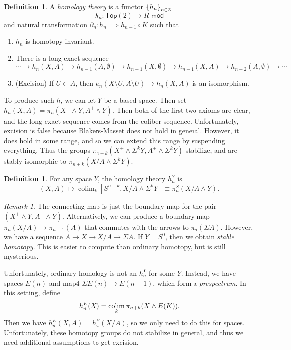\documentclass[leqno, openany]{memoir}
\theoremstyle{definition}
\newtheorem{defn}[thm]{Definition}
\theoremstyle{remark}
\newtheorem{rmk}[thm]{Remark}
\theoremstyle{plain}
\theoremstyle{definition}
\theoremstyle{remark}
\newcommand{\Z}{\mathbb{Z}}
\newcommand{\ms}[1]{\mathsf{#1}}
\newcommand{\ol}[1]{\overline{#1}}
\begin{document}
\begin{defn}
    A \textit{homology theory} is a functor $\qty{h_n}_{n \in \Z}$ 
    \[ h_n \colon \ms{Top}(2) \to R\text{-}\ms{mod} \]
    and natural transformation $\partial_n \colon h_n \implies h_{n-1} \circ K$ such that
    \begin{enumerate}
        \item $h_n$ is homotopy invariant.
        \item There is a long exact sequence
            \[ \cdots \to h_n(X, A) \to h_{n-1}(A, \emptyset) \to h_{n-1}(X, \emptyset) \to h_{n-1}(X,A) \to h_{n-2}(A, \emptyset) \to \cdots \]
        \item (Excision) If $\ol{U} \subset A$, then $h_n(X \setminus U, A \setminus U) \to h_n(X, A)$ is an isomorphism.
    \end{enumerate}
\end{defn}

To produce such $h$, we can let $Y$ be a based space. Then set $h_n(X, A) = \pi_n(X^+ \wedge Y, A^+ \wedge Y)$. Then both of the first two axioms are clear, and the long exact sequence comes from the cofiber sequence. Unfortunately, excision is false because Blakers-Masset does not hold in general. However, it does hold in some range, and so we can extend this range by suspending everything. Thus the groups $\pi_{n+k} (X^+ \wedge \Sigma^k Y, A^+ \wedge \Sigma^k Y)$ stabilize, and are stably isomorphic to $\pi_{n+k}(X/A \wedge \Sigma^k Y)$.

\begin{defn}
    For any space $Y$, the homology theory $h_n^Y$ is 
    \[ (X,A) \mapsto \operatorname{colim}_k [S^{n+k}, X/A \wedge \Sigma^k Y] \equiv \pi_n^S(X/A \wedge Y). \]
\end{defn}


\begin{rmk}
    The connecting map is just the boundary map for the pair $(X^+ \wedge Y, A^+ \wedge Y)$. Alternatively, we can produce a boundary map $\pi_n(X/A) \to \pi_{n-1}(A)$ that commutes with the arrows to $\pi_n(\Sigma A)$. However, we have a sequence $A \to X \to X/A \to \Sigma A$. If $Y = S^0$, then we obtain \textit{stable homotopy}. This is easier to compute than ordinary homotopy, but is still mysterious. 
\end{rmk}

Unfortunately, ordinary homology is not an $h_n^Y$ for some $Y$. Instead, we have spaces $E(n)$ and map4 $\Sigma E(n) \to E(n+1)$, which form a \textit{prespectrum}. In this setting, define
\[ h_n^E(X) = \operatornamewithlimits{colim}_k \pi_{n+k}(X \wedge E(K)). \]
Then we have $h_n^E(X,A) = h_n^E(X/A)$, so we only need to do this for spaces. Unfortunately, these homotopy groups do not stabilize in general, and thus we need additional assumptions to get excision.
\end{document}
